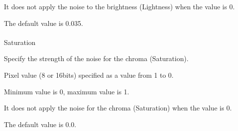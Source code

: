 \documentclass[a4paper,12pt]{article}
\begin{document}
It does not apply the noise to the brightness (Lightness) when the value is 0.\par
The default value is 0.035.\\
\\
Saturation\par
Specify the strength of the noise for the chroma (Saturation).\par
Pixel value (8 or 16bits) specified as a value from 1 to 0.\par
Minimum value is 0, maximum value is 1.\par
It does not apply the noise for the chroma (Saturation) when the value is 0.\par
The default value is 0.0.

\newpage

\thispagestyle{empty}
\end{document}
